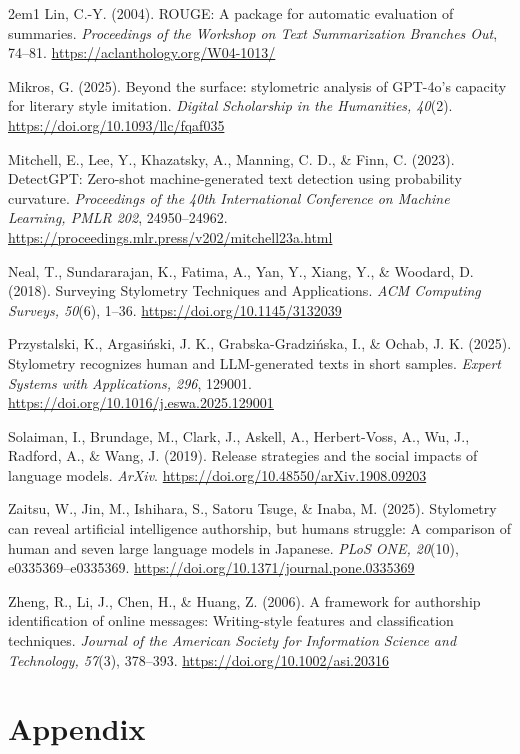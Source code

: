 \documentclass[12pt,a4paper]{article}
\begin{document}
\begin{hangparas}{2em}{1}
Lin, C.-Y. (2004). ROUGE: A package for automatic evaluation of summaries. \textit{Proceedings of the Workshop on Text Summarization Branches Out}, 74--81. \url{https://aclanthology.org/W04-1013/}

Mikros, G. (2025). Beyond the surface: stylometric analysis of GPT-4o's capacity for literary style imitation. \textit{Digital Scholarship in the Humanities, 40}(2). \url{https://doi.org/10.1093/llc/fqaf035}

Mitchell, E., Lee, Y., Khazatsky, A., Manning, C. D., \& Finn, C. (2023). DetectGPT: Zero-shot machine-generated text detection using probability curvature. \textit{Proceedings of the 40th International Conference on Machine Learning, PMLR 202}, 24950--24962. \url{https://proceedings.mlr.press/v202/mitchell23a.html}

Neal, T., Sundararajan, K., Fatima, A., Yan, Y., Xiang, Y., \& Woodard, D. (2018). Surveying Stylometry Techniques and Applications. \textit{ACM Computing Surveys, 50}(6), 1--36. \url{https://doi.org/10.1145/3132039}

Przystalski, K., Argasi\'nski, J. K., Grabska-Gradzi\'nska, I., \& Ochab, J. K. (2025). Stylometry recognizes human and LLM-generated texts in short samples. \textit{Expert Systems with Applications, 296}, 129001. \url{https://doi.org/10.1016/j.eswa.2025.129001}

Solaiman, I., Brundage, M., Clark, J., Askell, A., Herbert-Voss, A., Wu, J., Radford, A., \& Wang, J. (2019). Release strategies and the social impacts of language models. \textit{ArXiv}. \url{https://doi.org/10.48550/arXiv.1908.09203}


Zaitsu, W., Jin, M., Ishihara, S., Satoru Tsuge, \& Inaba, M. (2025). Stylometry can reveal artificial intelligence authorship, but humans struggle: A comparison of human and seven large language models in Japanese. \textit{PLoS ONE, 20}(10), e0335369--e0335369. \url{https://doi.org/10.1371/journal.pone.0335369}

Zheng, R., Li, J., Chen, H., \& Huang, Z. (2006). A framework for authorship identification of online messages: Writing-style features and classification techniques. \textit{Journal of the American Society for Information Science and Technology, 57}(3), 378--393. \url{https://doi.org/10.1002/asi.20316}

\end{hangparas}

\section{Appendix}
\end{document}
